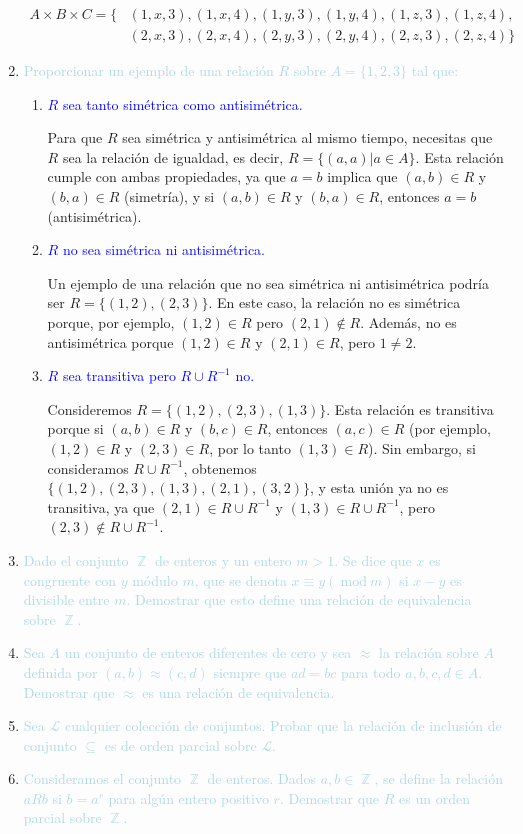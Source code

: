 \documentclass{article}
\newcommand{\lb}[1]{\textcolor{lightblue}{#1}}
\newcommand{\db}[1]{\textcolor{blue}{#1}}
\DeclareMathOperator{\Z}{\mathbb{Z}}
\renewcommand{\mod}{~\mathrm{mod}~}
\begin{document}
\begin{enumerate}[label=\color{red}\textbf{\arabic*)},leftmargin=*]
      \[\begin{aligned}
      	A\times B\times C=\{&(1,x,3),(1,x,4),(1,y,3),(1,y,4),(1,z,3),(1,z,4),\\
      	&(2,x,3),(2,x,4),(2,y,3),(2,y,4),(2,z,3),(2,z,4)\}
      \end{aligned}\]
      \item \lb{Proporcionar un ejemplo de una relación $R$ sobre $A=\{1,2,3\}$ tal que:}
      \begin{enumerate}[label=\color{red}\alph*)]
      	\item \db{$R$ sea tanto simétrica como antisimétrica.}
      	
      	Para que $R$ sea simétrica y antisimétrica al mismo tiempo, necesitas que $R$ sea la relación de igualdad, es decir, $R=\{(a,a)|a\in A\}$. Esta relación cumple con ambas propiedades, ya que $a=b$ implica que $(a,b)\in R$ y $(b,a)\in R$ (simetría), y si $(a,b)\in R$ y $(b,a)\in R$, entonces $a=b$ (antisimétrica).
      	\item \db{$R$ no sea simétrica ni antisimétrica.}
      	
      	Un ejemplo de una relación que no sea simétrica ni antisimétrica podría ser $R=\{(1,2),(2,3)\}$. En este caso, la relación no es simétrica porque, por ejemplo, $(1,2)\in R$ pero $(2,1)\notin R$. Además, no es antisimétrica porque $(1,2)\in R$ y $(2,1)\in R$, pero $1\neq2$.
      	\item \db{$R$ sea transitiva pero $R\cup R^{-1}$ no.}
      	
      	Consideremos $R=\{(1,2),(2,3),(1,3)\}$. Esta relación es transitiva porque si $(a,b)\in R$ y $(b,c)\in R$, entonces $(a,c)\in R$ (por ejemplo, $(1,2)\in R$ y $(2,3)\in R$, por lo tanto $(1,3)\in R$). Sin embargo, si consideramos $R\cup R^{-1}$, obtenemos $\{(1,2),(2,3),(1,3),(2,1),(3,2)\}$, y esta unión ya no es transitiva, ya que $(2,1)\in R\cup R^{-1}$ y $(1,3)\in R\cup R^{-1}$, pero $(2,3)\notin R\cup R^{-1}$.
      \end{enumerate}
      \item \lb{Dado el conjunto $\Z$ de enteros y un entero $m>1$. Se dice que $x$ es congruente con $y$ módulo $m$, que se denota $x\equiv y(\mod m)$ si $x-y$ es divisible entre $m$. Demostrar que esto define una relación de equivalencia sobre $\Z$.}
      \item \lb{Sea $A$ un conjunto de enteros diferentes de cero y sea $\approx$ la relación sobre $A$ definida por $(a,b)\approx(c,d)$ siempre que $ad=bc$ para todo $a,b,c,d\in A$. Demostrar que $\approx$ es una relación de equivalencia.}
      \item \lb{Sea $\mathcal{L}$ cualquier colección de conjuntos. Probar que la relación de inclusión de conjunto $\subseteq$ es de orden parcial sobre $\mathcal{L}$.}
      \item \lb{Consideramos el conjunto $\Z$ de enteros. Dados $a,b\in\Z$, se define la relación $aRb$ si $b=a^r$ para algún entero positivo $r$. Demostrar que $R$ es un orden parcial sobre $\Z$.}
\end{enumerate}
\newpage
\end{document}
